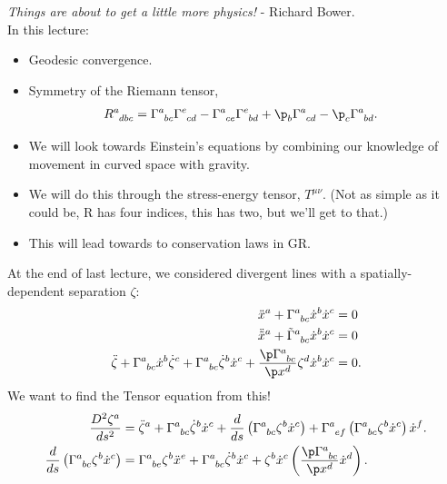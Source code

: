 \documentclass[a4paper, 11pt, normalem]{report}
\begin{document}
\chapter{}
\emph{Things are about to get a little more physics!} - Richard Bower. \\
In this lecture:
\begin{itemize}
    \item Geodesic convergence.
    \item Symmetry of the Riemann tensor,
        \begin{align}
            \tensor{R}{^a_{dbc}} &= \tensor{\Gamma}{^a_{bc}}\tensor{\Gamma}{^e_{cd}} - \tensor{\Gamma}{^a_{ce}}\tensor{\Gamma}{^e_{bd}} + \p_b\tensor{\Gamma}{^a_{cd}}-\p_c\tensor{\Gamma}{^a_{bd}}.
        \end{align}
    \item We will look towards Einstein's equations by combining our knowledge of movement in curved space with gravity.
    \item We will do this through the stress-energy tensor, $T^{\mu\nu}$. (Not as simple as it could be, R has four indices, this has two, but we'll get to that.)
    \item This will lead towards to conservation laws in GR.
\end{itemize}
At the end of last lecture, we considered divergent lines with a spatially-dependent separation $\zeta$:
\begin{align}
    \ddot{x}^a + \tensor{\Gamma}{^a_{bc}}\dot{x}^b\dot{x}^c &= 0 \\
    \ddot{\tilde{x}}^a + \tensor{\tilde{\Gamma}}{^a_{bc}}\dot{x}^b\dot{x}^c &= 0 \\
    \ddot{\zeta} + \tensor{\Gamma}{^a_{bc}}\dot{x}^b\dot{\zeta}^c + \tensor{\Gamma}{^a_{bc}}\dot{\zeta}^b\dot{x}^c + \frac{\p\tensor{\Gamma}{^a_{bc}}}{\p x^d}\zeta^d\dot{x}^b\dot{x}^c &= 0.
\end{align}
We want to find the Tensor equation from this!
\begin{align}
    \frac{D^2\zeta^a}{ds^2} &= \ddot{\zeta}^a + \tensor{\Gamma}{^a_{bc}}\dot{\zeta}^b\dot{x}^c + \frac{d}{ds}\left(\tensor{\Gamma}{^a_{bc}}\zeta^b\dot{x}^c\right) + \tensor{\Gamma}{^a_{ef}}\left(\tensor{\Gamma}{^a_{bc}}\zeta^b\dot{x}^c\right)\dot{x}^f.\\
    \frac{d}{ds}\left(\tensor{\Gamma}{^a_{bc}}\zeta^b\dot{x}^c\right) &= \tensor{\Gamma}{^a_{be}}\zeta^b\ddot{x}^e + \tensor{\Gamma}{^a_{bc}}\dot{\zeta}^b\dot{x}^c + \zeta^b\dot{x}^c\left(\frac{\p\tensor{\Gamma}{^a_{bc}}}{\p x^d}\dot{x}^d\right).
\end{align}
\end{document}

